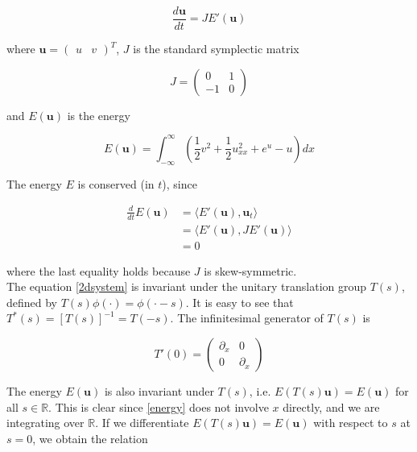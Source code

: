\documentclass[12pt]{article}
\def\R{{\mathbb R}}
\begin{document}
\begin{equation}\label{2dsystem}
\frac{d \textbf{u} }{dt} = J E'(\textbf{u})
\end{equation}

where $\textbf{u} = \begin{pmatrix}u&v\end{pmatrix}^T$, $J$ is the standard symplectic matrix

\begin{equation*}
J = \begin{pmatrix}0 & 1 \\ -1 & 0 \end{pmatrix}
\end{equation*}

and $E(\textbf{u})$ is the energy

\begin{equation}\label{energy}
E(\textbf{u}) = \int_{-\infty}^\infty \left(\frac{1}{2} v^2 + \frac{1}{2}u_{xx}^2 + e^{u} - u \right)dx
\end{equation}

The energy $E$ is conserved (in $t$), since

\begin{align*}
\frac{d}{dt} E(\textbf{u}) &= \langle E'(\textbf{u}), \textbf{u}_t \rangle \\
&= \langle E'(\textbf{u}), J E'(\textbf{u}) \rangle \\
&= 0
\end{align*}

where the last equality holds because $J$ is skew-symmetric.\\

The equation \eqref{2dsystem} is invariant under the unitary translation group $T(s)$, defined by $T(s)\phi(\cdot) = \phi(\cdot - s)$. It is easy to see that $T^*(s) = [T(s)]^{-1} = T(-s)$. The infinitesimal generator of $T(s)$ is

\begin{equation}
T'(0) = \begin{pmatrix}\partial_x & 0 \\ 0 & \partial_x \end{pmatrix}
\end{equation}

The energy $E(\textbf{u})$ is also invariant under $T(s)$, i.e. $E(T(s) \textbf{u}) = E(\textbf{u})$ for all $s \in \R$. This is clear since \eqref{energy} does not involve $x$ directly, and we are integrating over $\R$. If we differentiate $E(T(s) \textbf{u}) = E(\textbf{u})$ with respect to $s$ at $s = 0$, we obtain the relation
\end{document}
